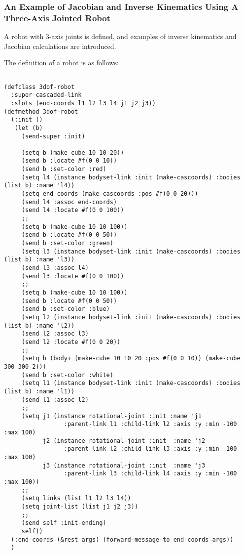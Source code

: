 \subsubsection{An Example of Jacobian and Inverse Kinematics Using A Three-Axis Jointed Robot}

A robot with 3-axis joints is defined, and examples of inverse kinematics and Jacobian calculations are introduced.

The definition of a robot is as follows:
{\baselineskip=10pt
\begin{verbatim}

(defclass 3dof-robot
  :super cascaded-link
  :slots (end-coords l1 l2 l3 l4 j1 j2 j3))
(defmethod 3dof-robot
  (:init ()
   (let (b)
     (send-super :init)

     (setq b (make-cube 10 10 20))
     (send b :locate #f(0 0 10))
     (send b :set-color :red)
     (setq l4 (instance bodyset-link :init (make-cascoords) :bodies (list b) :name 'l4))
     (setq end-coords (make-cascoords :pos #f(0 0 20)))
     (send l4 :assoc end-coords)
     (send l4 :locate #f(0 0 100))
     ;;
     (setq b (make-cube 10 10 100))
     (send b :locate #f(0 0 50))
     (send b :set-color :green)
     (setq l3 (instance bodyset-link :init (make-cascoords) :bodies (list b) :name 'l3))
     (send l3 :assoc l4)
     (send l3 :locate #f(0 0 100))
     ;;
     (setq b (make-cube 10 10 100))
     (send b :locate #f(0 0 50))
     (send b :set-color :blue)
     (setq l2 (instance bodyset-link :init (make-cascoords) :bodies (list b) :name 'l2))
     (send l2 :assoc l3)
     (send l2 :locate #f(0 0 20))
     ;;
     (setq b (body+ (make-cube 10 10 20 :pos #f(0 0 10)) (make-cube 300 300 2)))
     (send b :set-color :white)
     (setq l1 (instance bodyset-link :init (make-cascoords) :bodies (list b) :name 'l1))
     (send l1 :assoc l2)
     ;;
     (setq j1 (instance rotational-joint :init :name 'j1
                 :parent-link l1 :child-link l2 :axis :y :min -100 :max 100)
           j2 (instance rotational-joint :init  :name 'j2
                 :parent-link l2 :child-link l3 :axis :y :min -100 :max 100)
           j3 (instance rotational-joint :init  :name 'j3
                 :parent-link l3 :child-link l4 :axis :y :min -100 :max 100))
     ;;
     (setq links (list l1 l2 l3 l4))
     (setq joint-list (list j1 j2 j3))
     ;;
     (send self :init-ending)
     self))
  (:end-coords (&rest args) (forward-message-to end-coords args))
  )
\end{verbatim}
}

